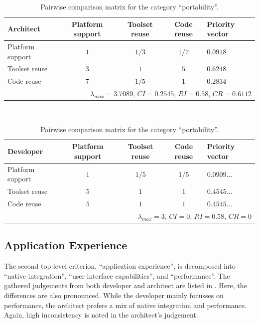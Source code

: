 \begin{table}[h!]
    \centering
    \begin{tabular}{lcccl}
        \hline
        \textbf{Architect}     & Platform support & Toolset reuse & Code reuse & Priority vector \\ 
        \hline
        Platform support       & $1$            & $1/3$         & $1/7$      & $0.0918$          \\
        Toolset reuse          & $3$            & $1$           & $5$        & $0.6248$          \\
        Code reuse             & $7$            & $1/5$         & $1$        & $0.2834$          \\
        \hline
        \multicolumn{5}{r}{$\lambda_{max} = 3.7089$, $CI = 0.2545$, $RI = 0.58$, $CR = 0.6112$}  \\
        \hline
    \end{tabular}
    \\\vspace{1em}
    \begin{tabular}{lcccl}
        \hline
        \textbf{Developer}     & Platform support & Toolset reuse & Code reuse & Priority vector \\ 
        \hline
        Platform support       & $1$            & $1/5$         & $1/5$      & $0.0909\ldots$    \\
        Toolset reuse          & $5$            & $1$           & $1$        & $0.4545\ldots$    \\
        Code reuse             & $5$            & $1$           & $1$        & $0.4545\ldots$    \\
        \hline
        \multicolumn{5}{r}{$\lambda_{max} = 3$, $CI = 0$, $RI = 0.58$, $CR = 0$}                 \\
        \hline
    \end{tabular}
    \caption{Pairwise comparison matrix for the category ``portability''.}
    \label{tab:portability}
\end{table}

\subsection{Application Experience}

The second top-level criterion, ``application experience'', is decomposed into ``native integration'', ``user interface capabilities'', and ``performance''. The gathered judgements from both developer and architect are listed in . Here, the differences are also pronounced. While the developer mainly focusses on performance, the architect prefers a mix of native integration and performance. Again, high inconsistency is noted in the architect's judgement.

